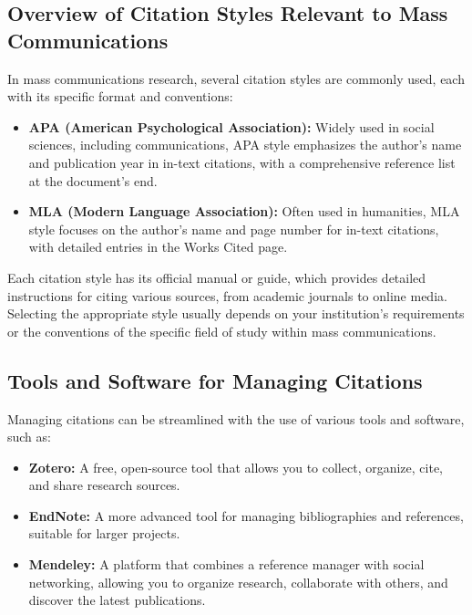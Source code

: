 \documentclass[
]{book}
\providecommand{\tightlist}{%
  \setlength{\itemsep}{0pt}\setlength{\parskip}{0pt}}
\begin{document}
\hypertarget{overview-of-citation-styles-relevant-to-mass-communications}{%
\subsection*{Overview of Citation Styles Relevant to Mass Communications}\label{overview-of-citation-styles-relevant-to-mass-communications}}

In mass communications research, several citation styles are commonly used, each with its specific format and conventions:

\begin{itemize}
\item
  \textbf{APA (American Psychological Association):} Widely used in social sciences, including communications, APA style emphasizes the author's name and publication year in in-text citations, with a comprehensive reference list at the document's end.
\item
  \textbf{MLA (Modern Language Association):} Often used in humanities, MLA style focuses on the author's name and page number for in-text citations, with detailed entries in the Works Cited page.
\end{itemize}

Each citation style has its official manual or guide, which provides detailed instructions for citing various sources, from academic journals to online media. Selecting the appropriate style usually depends on your institution's requirements or the conventions of the specific field of study within mass communications.

\hypertarget{tools-and-software-for-managing-citations}{%
\subsection*{Tools and Software for Managing Citations}\label{tools-and-software-for-managing-citations}}

Managing citations can be streamlined with the use of various tools and software, such as:

\begin{itemize}
\tightlist
\item
  \textbf{Zotero:} A free, open-source tool that allows you to collect, organize, cite, and share research sources.
\item
  \textbf{EndNote:} A more advanced tool for managing bibliographies and references, suitable for larger projects.
\item
  \textbf{Mendeley:} A platform that combines a reference manager with social networking, allowing you to organize research, collaborate with others, and discover the latest publications.
\end{itemize}
\end{document}

